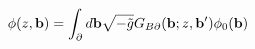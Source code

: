 \begin{equation} \label{bulk boundary gives phi}
\phi(z,{\bf b}) = \int _\partial d{\bf b} \sqrt{-\tilde{g}} G_{B\partial}({\bf b};z,{\bf b'}) \phi_0 ({\bf b})
\end{equation}

